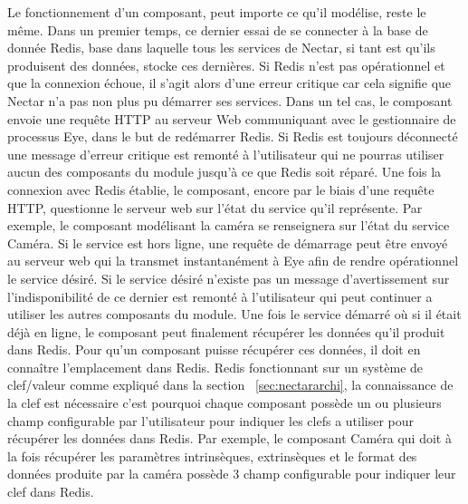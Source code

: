 Le fonctionnement d'un composant, peut importe ce qu'il modélise, reste le même. Dans un premier temps, ce dernier essai de se connecter à la base de donnée Redis, base dans laquelle tous les services de Nectar, si tant est qu'ils produisent des données, stocke ces dernières. Si Redis n'est pas opérationnel et que la connexion échoue, il s'agit alors d'une erreur critique car cela signifie que Nectar n'a pas non plus pu démarrer ses services. Dans un tel cas, le composant envoie une requête HTTP au serveur Web communiquant avec le gestionnaire de processus Eye, dans le but de redémarrer Redis. Si Redis est toujours déconnecté une message d'erreur critique est remonté à l'utilisateur qui ne pourras utiliser aucun des composants du module jusqu'à ce que Redis soit réparé.
Une fois la connexion avec Redis établie, le composant, encore par le biais d'une requête HTTP, questionne le serveur web sur l'état du service qu'il représente. Par exemple, le composant modélisant la caméra se renseignera sur l'état du service Caméra. Si le service est hors ligne, une requête de démarrage peut être envoyé au serveur web qui la transmet instantanément à Eye afin de rendre opérationnel le service désiré. Si le service désiré n'existe pas un message d'avertissement sur l'indisponibilité de ce dernier est remonté à l'utilisateur qui peut continuer a utiliser les autres composants du module.
Une fois le service démarré où si il était déjà en ligne, le composant peut finalement récupérer les données qu'il produit dans Redis. Pour qu'un composant puisse récupérer ces données, il doit en connaître l'emplacement dans Redis. Redis fonctionnant sur un système de clef/valeur comme expliqué dans la section ~\ref{sec:nectararchi}, la connaissance de la clef est nécessaire c'est pourquoi chaque composant possède un ou plusieurs champ configurable par l'utilisateur pour indiquer les clefs a utiliser pour récupérer les données dans Redis. Par exemple, le composant Caméra qui doit à la fois récupérer les paramètres intrinsèques, extrinsèques et le format des données produite par la caméra possède 3 champ configurable pour indiquer leur clef dans Redis.

